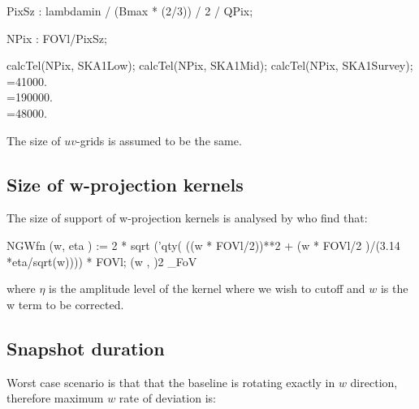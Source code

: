 \documentclass[useAMS,usenatbib,referee]{article}
\begin{document}
\begin{maxima}[]
PixSz : lambdamin / (Bmax * (2/3)) / 2 / QPix;
\maximaoutput*
{} \\
\end{maxima}

\begin{maxima}[]
NPix : FOVl/PixSz; 

calcTel(NPix, SKA1Low);
calcTel(NPix, SKA1Mid);
calcTel(NPix, SKA1Survey);
\maximaoutput*
{} \\
\m  {}=41000. \\
\m  {}=190000. \\
\m  {}=48000. \\
\end{maxima}

The size of $uv$-grids is assumed to be the same. 

\subsection{Size of w-projection kernels}

The size of support of w-projection kernels is analysed by
\cite{Mitchell2014} who find that:
\begin{maxima}[]
NGWfn (w, eta )  := 2 * sqrt ('qty( ((w * FOVl/2))**2 + (w * FOVl/2 )/(3.14 *eta/sqrt(w))))  * FOVl;
\maximaoutput*
\m  {}\left(w , \eta\right)\mathbin{:=}2\,\,\theta_{\rm FoV} \\
\end{maxima}
where $\eta$ is the amplitude level of the kernel where we wish to
cutoff and $w$ is the w term to be corrected. 

\subsection{Snapshot duration}

Worst case scenario is that that the baseline is rotating exactly in
$w$ direction, therefore maximum $w$ rate of deviation is:
\end{document}
